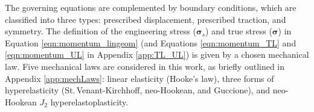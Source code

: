 \documentclass[sn-mathphys,Numbered]{sn-jnl}%
\newcommand{\bb}{\boldsymbol}
\begin{document}



The governing equations are complemented by boundary conditions, which are classified into three types: prescribed displacement, prescribed traction, and symmetry.
The definition of the engineering stress ($\bb{\sigma}_s$) and true stress ($\bb{\sigma}$) in Equation \ref{eqn:momentum_lingeom} (and Equations \ref{eqn:momentum_TL} and \ref{eqn:momentum_UL} in Appendix \ref{app:TL_UL})  is given by a chosen mechanical law.
Five mechanical laws are considered in this work, as briefly outlined in Appendix \ref{app:mechLaws}: linear elasticity (Hooke's law), three forms of hyperelasticity (St.\,Venant-Kirchhoff, neo-Hookean, and Guccione), and neo-Hookean $J_2$ hyperelastoplasticity.
\end{document}
